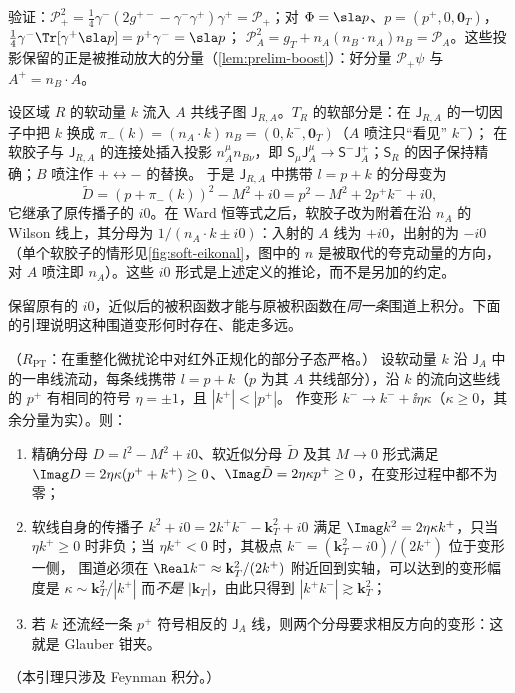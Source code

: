 验证：$\mathcal P_+^2=\frac14\gamma^-(2g^{+-}-\gamma^-\gamma^+)\gamma^+=\mathcal P_+$；对 $\Phi=\sla p$、$p=(p^+,0,\mathbf 0_T)$，$\frac14\gamma^-\Tr[\gamma^+\sla p]=p^+\gamma^-=\sla p$；
$\mathcal P_A^2=g_T+n_A(n_B\cdot n_A)n_B=\mathcal P_A$。这些投影保留的正是被推动放大的分量（\cref{lem:prelim-boost}）：好分量 $\mathcal P_+\psi$ 与 $A^+=n_B\cdot A$。

\begin{definition}\label{def:method-soft-approx}
设区域 $R$ 的软动量 $k$ 流入 $A$ 共线子图 $\mathsf J_{R,A}$。$T_R$ 的软部分是：在 $\mathsf J_{R,A}$ 的一切因子中把 $k$ 换成 $\pi_-(k)=(n_A\cdot k)\,n_B=(0,k^-,\mathbf 0_T)$（$A$ 喷注只“看见” $k^-$）；
在软胶子与 $\mathsf J_{R,A}$ 的连接处插入投影 $n_A^\mu n_{B\nu}$，即 $\mathsf S_\mu\mathsf J_A^\mu\to\mathsf S^-\mathsf J_A^+$；$\mathsf S_R$ 的因子保持精确；$B$ 喷注作 $+\leftrightarrow-$ 的替换。
于是 $\mathsf J_{R,A}$ 中携带 $l=p+k$ 的分母变为
\begin{equation}\label{eq:method-Dtilde}
\tilde D=(p+\pi_-(k))^2-M^2+i0=p^2-M^2+2p^+k^-+i0 ,
\end{equation}
它继承了原传播子的 $i0$。在 Ward 恒等式之后，软胶子改为附着在沿 $n_A$ 的 Wilson 线上，其分母为 $1/(n_A\cdot k\pm i0)$：入射的 $A$ 线为 $+i0$，出射的为 $-i0$
（单个软胶子的情形见\cref{fig:soft-eikonal}，图中的 $n$ 是被取代的夸克动量的方向，对 $A$ 喷注即 $n_A$）。这些 $i0$ 形式是上述定义的推论，而不是另加的约定。%
\end{definition}

保留原有的 $i0$，近似后的被积函数才能与原被积函数在\emph{同一条}围道上积分。下面的引理说明这种围道变形何时存在、能走多远。

\begin{lemma}\label{lem:method-i0-compat}
（$R_{\mathrm{PT}}$：在重整化微扰论中对红外正规化的部分子态严格。）
设软动量 $k$ 沿 $\mathsf J_A$ 中的一串线流动，每条线携带 $l=p+k$（$p$ 为其 $A$ 共线部分），沿 $k$ 的流向这些线的 $p^+$ 有相同的符号 $\eta=\pm1$，且 $|k^+|<|p^+|$。
作变形 $k^-\to k^-+\ii\eta\kappa$（$\kappa\ge0$，其余分量为实）。则：
\begin{enumerate}[label=(\alph*),leftmargin=2em,itemsep=1pt,topsep=2pt]
\item 精确分母 $D=l^2-M^2+i0$、软近似分母 $\tilde D$ 及其 $M\to0$ 形式满足 $\Imag D=2\eta\kappa(p^++k^+)\ge0$、$\Imag\tilde D=2\eta\kappa p^+\ge0$，在变形过程中都不为零；
\item 软线自身的传播子 $k^2+i0=2k^+k^--\mathbf k_T^2+i0$ 满足 $\Imag k^2=2\eta\kappa k^+$，只当 $\eta k^+\ge0$ 时非负；当 $\eta k^+<0$ 时，其极点 $k^-=(\mathbf k_T^2-i0)/(2k^+)$ 位于变形一侧，
  围道必须在 $\Real k^-\approx\mathbf k_T^2/(2k^+)$ 附近回到实轴，可以达到的变形幅度是 $\kappa\sim\mathbf k_T^2/|k^+|$ 而\emph{不是} $|\mathbf k_T|$，由此只得到 $|k^+k^-|\gtrsim\mathbf k_T^2$；
\item 若 $k$ 还流经一条 $p^+$ 符号相反的 $\mathsf J_A$ 线，则两个分母要求相反方向的变形：这就是 Glauber 钳夹。
\end{enumerate}
（本引理只涉及 Feynman 积分。）
\end{lemma}

